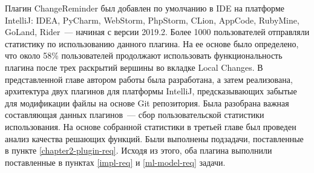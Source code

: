 Плагин ChangeReminder был добавлен по умолчанию в IDE на платформе IntelliJ: IDEA, PyCharm, WebStorm, PhpStorm, CLion, AppCode, RubyMine, GoLand, Rider~--- начиная с версии 2019.2. Более 1000 пользователей отправляли статистику по использованию данного плагина. На ее основе было определено, что около 58\% пользователей продолжают использовать функциональность плагина после трех раскрытий вершины во вкладке Local Changes.
\chapterconclusion
В представленной главе автором работы была разработана, а затем реализована, архитектура двух плагинов для платформы IntelliJ, предсказывающих забытые для модификации файлы на основе Git репозитория. Была разобрана важная составляющая данных плагинов~--- сбор пользовательской статистики использования. На основе собранной статистики в третьей главе был проведен анализ качества решающих функций. Были выполнены подзадачи, поставленные в пункте \ref{chapter2-plugin-req}. Исходя из этого, оба плагина выполнили поставленные в пунктах \ref{impl-req} и \ref{ml-model-req} задачи.